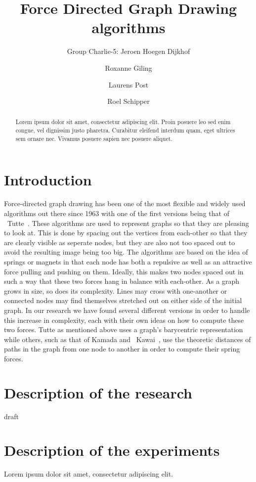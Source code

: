 \documentclass[a4paper,12pt,twoside]{article}
\begin{document}
\title{Force Directed Graph Drawing algorithms}
\author{Group Charlie-5: Jeroen Hoegen Dijkhof \and Roxanne Giling \and Laurens Post \and Roel Schipper}
\maketitle
\begin{abstract}
Lorem ipsum dolor sit amet, consectetur adipiscing elit. Proin posuere leo sed enim congue, vel dignissim justo pharetra. Curabitur eleifend interdum quam, eget ultrices sem ornare nec. Vivamus posuere sapien nec posuere aliquet.
\end{abstract}
\newpage

\tableofcontents
\newpage

\section{Introduction}\label{s:Introduction}
Force-directed graph drawing has been one of the most flexible and widely used algorithms out there since 1963 with one of the first versions being that of ~Tutte~\cite{Tutte}. These algorithms are used to represent graphs so that they are pleasing to look at. This is done by spacing out the vertices from each-other so that they are clearly visible as seperate nodes, but they are also not too spaced out to avoid the resulting image being too big. The algorithms are based on the idea of springs or magnets in that each node has both a repulsive as well as an attractive force pulling and pushing on them. Ideally, this makes two nodes spaced out in such a way that these two forces hang in balance with each-other. As a graph grows in size, so does its complexity. Lines may cross with one-another or connected nodes may find themselves stretched out on either side of the initial graph. In our research we have found several different versions in order to handle this increase in complexity, each with their own ideas on how to compute these two forces. Tutte as mentioned above uses a graph's barycentric representation while others, such as that of Kamada and ~Kawai~\cite{Kawai}, use the theoretic distances of paths in the graph from one node to another in order to compute their spring forces.

\section{Description of the research}
draft

\section{Description of the experiments}
Lorem ipsum dolor sit amet, consectetur adipiscing elit.
\end{document}
